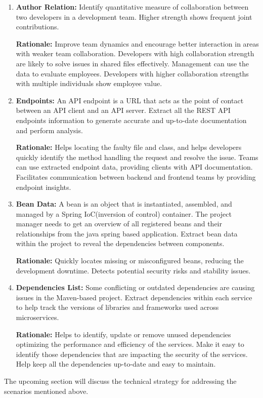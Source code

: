 \begin{enumerate}[before={\vspace{10pt}}, after={\vspace{10pt}}, itemsep=10pt, nosep, leftmargin=\parindent, labelindent=0pt]
    \vspace{10pt}
    \item \textbf{Author Relation:} Identify quantitative measure of collaboration between two developers in a development team. Higher strength shows frequent joint contributions.
    
    \textbf{Rationale:} Improve team dynamics and encourage better interaction in areas with weaker team collaboration. Developers with high collaboration strength are likely to solve issues in shared files effectively. Management can use the data to evaluate employees. Developers with higher collaboration strengths with multiple individuals show employee value.
    
    \vspace{10pt}
    \item \textbf{Endpoints:} An API endpoint is a URL that acts as the point of contact between an API client and an API server\citep{postman_api_endpoint}. Extract all the REST API endpoints information to generate accurate and up-to-date documentation and perform analysis.
    
    \textbf{Rationale:} Helps locating the faulty file and class, and helps developers quickly identify the method handling the request and resolve the issue. Teams can use extracted endpoint data, providing clients with API documentation. Facilitates communication between backend and frontend teams by providing endpoint insights.
    
    \vspace{10pt}
    \item \textbf{Bean Data:} A bean is an object that is instantiated, assembled, and managed by a Spring IoC(inversion of control) container\citep{spring_beans_doc}. The project manager needs to get an overview of all registered beans and their relationships from the java spring based application. Extract bean data within the project to reveal the dependencies between components.
    
    \textbf{Rationale:} Quickly locates missing or misconfigured beans, reducing the development downtime. Detects potential security risks and stability issues.
    
    \vspace{10pt}
    \item \textbf{Dependencies List:} Some conflicting or outdated dependencies are causing issues in the Maven-based project. Extract dependencies within each service to help track the versions of libraries and frameworks used across microservices.
    
    \textbf{Rationale:} Helps to identify, update or remove unused dependencies optimizing the performance and efficiency of the services. Make it easy to identify those dependencies that are impacting the security of the services. Help keep all the dependencies up-to-date and easy to maintain.
\end{enumerate}

The upcoming section will discuss the technical strategy for addressing the scenarios mentioned above.